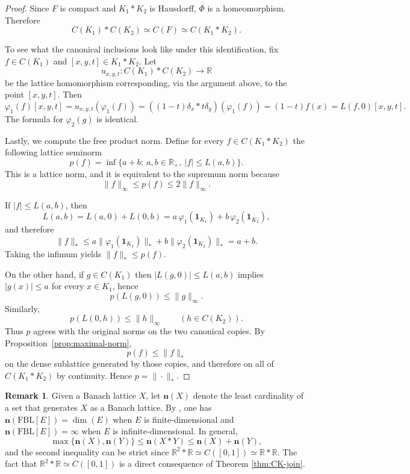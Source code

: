 \documentclass[12pt]{amsart}
\newcommand{\FBL}{\mathrm{FBL}}
\newcommand{\one}{\mathbf{1}}
\theoremstyle{plain}
\theoremstyle{definition}
\newtheorem{remark}[theorem]{Remark}
\begin{document}
\begin{proof}
Since $F$ is compact and $K_1\ast K_2$ is Hausdorff, $\Phi$ is a homeomorphism. Therefore
\[
C(K_1)\ast C(K_2)\simeq C(F)\simeq C(K_1\ast K_2).
\]

To see what the canonical inclusions look like under this identification, fix $f\in C(K_1)$ and $[x,y,t]\in K_1\ast K_2$. Let
\[
u_{x,y,t}:C(K_1)\ast C(K_2)\to \mathbb{R}
\]
be the lattice homomorphism corresponding, via the argument above, to the point $[x,y,t]$. Then
\[
\varphi_1(f)[x,y,t]
=u_{x,y,t}(\varphi_1(f))
=((1-t)\delta_x\ast t\delta_y)(\varphi_1(f))
=(1-t)f(x)
=L(f,0)[x,y,t].
\]
The formula for $\varphi_2(g)$ is identical.

Lastly, we compute the free product norm. Define for every $f\in C(K_1*K_2)$ the following lattice seminorm
\[
p(f)=\inf\Big\{a+b:\ a,b\in\mathbb R_+,\ |f|\leq L(a,b)\Big\}.
\]
This is a lattice norm, and it is equivalent to the supremum norm because
\[
\|f\|_\infty\leq p(f)\leq 2\|f\|_\infty.
\]

If $|f|\leq L(a,b)$, then
\[
L(a,b)=L(a,0)+L(0,b)=a\,\varphi_1(\one_{K_1})+b\,\varphi_2(\one_{K_2}),
\]
and therefore
\[
\|f\|_{\ast}\leq a\|\varphi_1(\one_{K_1})\|_{\ast}+b\|\varphi_2(\one_{K_2})\|_{\ast}=a+b.
\]
Taking the infimum yields $\|f\|_{\ast}\leq p(f)$.

On the other hand, if $g\in C(K_1)$ then $|L(g,0)|\leq L(a,b)$ implies $|g(x)|\leq a$ for every $x\in K_1$, hence
\[
p(L(g,0))\leq\|g\|_\infty.
\]
Similarly,
\[
p(L(0,h))\leq\|h\|_\infty
\qquad (h\in C(K_2)).
\]
Thus $p$ agrees with the original norms on the two canonical copies. By Proposition~\ref{prop:maximal-norm},
\[
p(f)\leq \|f\|_{\ast}
\]
on the dense sublattice generated by those copies, and therefore on all of $C(K_1\ast K_2)$ by continuity. Hence $p=\|\cdot\|_{\ast}$.
\end{proof}



\begin{remark} 
Given a Banach lattice $X$, let $\mathbf{n}(X)$ denote the least cardinality of a set that generates $X$ as a Banach lattice. By \cite[Proposition~9.6]{freebanlat}, one has $\mathbf{n}(\FBL[E])=\dim(E)$ when $E$ is finite-dimensional and $\mathbf{n}(\FBL[E])=\infty$ when $E$ is infinite-dimensional. In general,
\[
\max\{\mathbf{n}(X),\mathbf{n}(Y)\}\leq \mathbf{n}(X\ast Y)\leq \mathbf{n}(X)+\mathbf{n}(Y),
\]
and the second inequality can be strict since $\mathbb{R}^2\ast \mathbb{R}\simeq C([0,1])\simeq \mathbb{R}\ast \mathbb{R}$. The fact that $\mathbb{R}^2\ast \mathbb{R}\simeq C([0,1])$ is a direct consequence of Theorem \ref{thm:CK-join}.
\end{remark}
\end{document}
